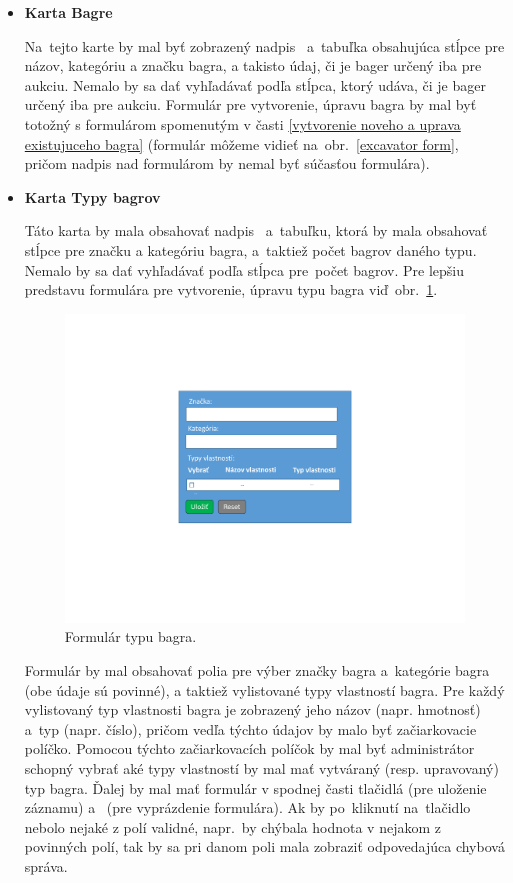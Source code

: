 \begin{itemize}
\item \textbf{Karta Bagre}

Na~tejto karte by mal byť zobrazený nadpis~ a~tabuľka obsahujúca stĺpce pre názov, kategóriu a značku bagra, a takisto údaj, či je bager určený iba pre aukciu. Nemalo by sa dať vyhľadávať podľa stĺpca, ktorý udáva, či je bager určený iba pre aukciu. Formulár pre vytvorenie, úpravu bagra by mal byť totožný s formulárom spomenutým v časti \ref{vytvorenie noveho a uprava existujuceho bagra} (formulár môžeme vidieť na~obr.~\ref{excavator form}, pričom nadpis nad formulárom by nemal byť súčasťou formulára).
\newpage
\item \textbf{Karta Typy bagrov}

Táto karta by mala obsahovať nadpis~ a~tabuľku, ktorá by mala obsahovať stĺpce pre značku a kategóriu bagra, a~taktiež počet bagrov daného typu. Nemalo by sa dať vyhľadávať podľa stĺpca pre~počet bagrov. Pre lepšiu predstavu formulára pre vytvorenie, úpravu typu bagra viď~obr.~\ref{excavator type form}.

\begin{figure}[H]\centering
\includegraphics[width=140mm]{../img/UI concept/excavator type form}
\caption{Formulár typu bagra.}
\label{excavator type form}
\end{figure}

Formulár by mal obsahovať polia pre výber značky bagra a~kategórie bagra (obe údaje sú povinné), a taktiež vylistované typy vlastností bagra. Pre každý vylistovaný typ vlastnosti bagra je zobrazený jeho názov (napr. hmotnosť) a~typ (napr. číslo), pričom vedľa týchto údajov by malo byť začiarkovacie políčko. Pomocou týchto začiarkovacích políčok by mal byť administrátor schopný vybrať aké typy vlastností by mal mať vytváraný (resp. upravovaný) typ bagra. Ďalej by mal mať formulár v spodnej časti tlačidlá  (pre uloženie záznamu) a~ (pre vyprázdenie formulára). Ak by po~kliknutí na~tlačidlo  nebolo nejaké z polí validné, napr.~by chýbala hodnota v nejakom z povinných polí, tak by sa pri danom poli mala zobraziť odpovedajúca chybová správa.


\end{itemize}
